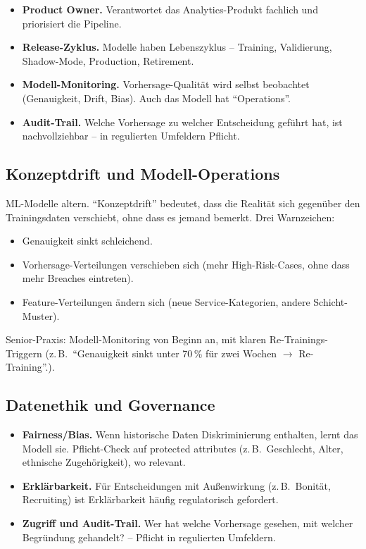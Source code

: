 \documentclass[11pt,a4paper,oneside]{article}
\newcommand{\fachbegriff}[1]{\textbf{#1}}
\begin{document}
\begin{itemize}
  \item \fachbegriff{Product Owner.} Verantwortet das Analytics-Produkt fachlich und priorisiert die Pipeline.
  \item \fachbegriff{Release-Zyklus.} Modelle haben Lebenszyklus -- Training, Validierung, Shadow-Mode, Production, Retirement.
  \item \fachbegriff{Modell-Monitoring.} Vorhersage-Qualität wird selbst beobachtet (Genauigkeit, Drift, Bias). Auch das Modell hat ``Operations''.
  \item \fachbegriff{Audit-Trail.} Welche Vorhersage zu welcher Entscheidung geführt hat, ist nachvollziehbar -- in regulierten Umfeldern Pflicht.
\end{itemize}

\subsection{Konzeptdrift und Modell-Operations}

ML-Modelle altern. ``Konzeptdrift'' bedeutet, dass die Realität sich gegenüber den Trainingsdaten verschiebt, ohne dass es jemand bemerkt. Drei Warnzeichen:

\begin{itemize}
  \item Genauigkeit sinkt schleichend.
  \item Vorhersage-Verteilungen verschieben sich (mehr High-Risk-Cases, ohne dass mehr Breaches eintreten).
  \item Feature-Verteilungen ändern sich (neue Service-Kategorien, andere Schicht-Muster).
\end{itemize}

Senior-Praxis: Modell-Monitoring von Beginn an, mit klaren Re-Trainings-Triggern (z.\,B.\ ``Genauigkeit sinkt unter 70\,\% für zwei Wochen $\rightarrow$ Re-Training''.).

\subsection{Datenethik und Governance}

\begin{itemize}
  \item \fachbegriff{Fairness/Bias.} Wenn historische Daten Diskriminierung enthalten, lernt das Modell sie. Pflicht-Check auf protected attributes (z.\,B.\ Geschlecht, Alter, ethnische Zugehörigkeit), wo relevant.
  \item \fachbegriff{Erklärbarkeit.} Für Entscheidungen mit Außenwirkung (z.\,B.\ Bonität, Recruiting) ist Erklärbarkeit häufig regulatorisch gefordert.
  \item \fachbegriff{Zugriff und Audit-Trail.} Wer hat welche Vorhersage gesehen, mit welcher Begründung gehandelt? -- Pflicht in regulierten Umfeldern.
\end{itemize}
\end{document}
